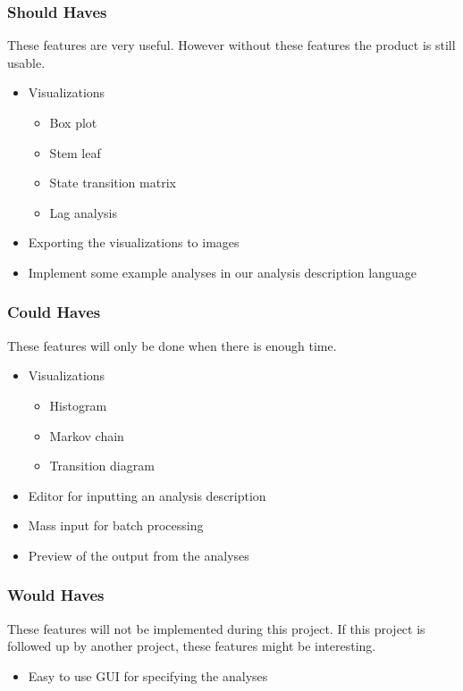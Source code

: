 \subsubsection{Should Haves}
These features are very useful. However without these features the product is still usable.
\begin{itemize}
	\item Visualizations
    \begin{itemize}
    	\item Box plot
        \item Stem leaf
        \item State transition matrix
        \item Lag analysis
    \end{itemize}
	\item Exporting the visualizations to images
    \item Implement some example analyses in our analysis description language
\end{itemize}

\subsubsection{Could Haves}
These features will only be done when there is enough time.
 \begin{itemize}
  \item Visualizations
  \begin{itemize}
	  \item Histogram
      \item Markov chain
      \item Transition diagram
  \end{itemize}
  \item Editor for inputting an analysis description 
  \item Mass input for batch processing 
  \item Preview of the output from the analyses
\end{itemize}

\subsubsection{Would Haves}
These features will not be implemented during this project. If this project is followed up by another project, these features might be interesting.
\begin{itemize}
	\item Easy to use GUI for specifying the analyses 
\end{itemize}
